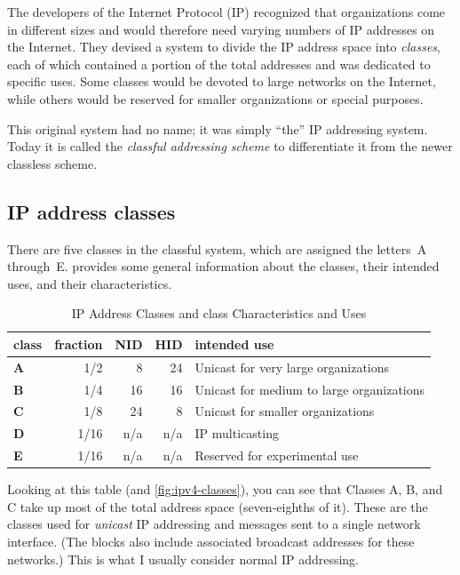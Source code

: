 The developers of the Internet Protocol (IP) recognized that organizations come in different sizes and would therefore need varying
numbers of IP addresses on the Internet.
They devised a system to divide the IP address space into {\emph{classes}}, each of which contained a portion of the total addresses and was dedicated to specific uses.
Some classes would be devoted to large networks on the Internet, while others would be reserved for smaller organizations or special purposes.

This original system had no name; it was simply ``the'' IP addressing system.
Today it is called the \emph{classful addressing scheme} to differentiate it from the newer classless scheme.



\subsection{IP address classes}

There are five classes in the classful system, which are assigned the letters~A through~E.
 provides some general information about the classes, their intended uses, and their characteristics.

\begin{table}
   \begin{tabular}{lrrrl}
   \toprule
   class      & fraction & NID & HID & intended use\\
   \midrule
   \textbf{A} & 1/2      & 8   & 24  & Unicast for very large organizations\\
   \textbf{B} & 1/4      & 16  & 16  & Unicast for medium to large organizations\\
   \textbf{C} & 1/8      & 24  & 8   & Unicast for smaller organizations\\
   \textbf{D} & 1/16     & n/a & n/a & IP multicasting\\
   \textbf{E} & 1/16     & n/a & n/a & Reserved for experimental use\\
   \bottomrule
   \end{tabular}
   \caption{IP Address Classes and class Characteristics and Uses}
   \label{tab:ip-address-classes}
\end{table}

Looking at this table (and \cref{fig:ipv4-classes}), you can see that Classes A, B, and C take up most of the total address space (seven-eighths of it).
These are the classes used for {\emph{unicast}} IP addressing and messages sent to a single network interface.
(The blocks also include associated broadcast addresses for these networks.)
This is what I usually consider normal IP addressing.


